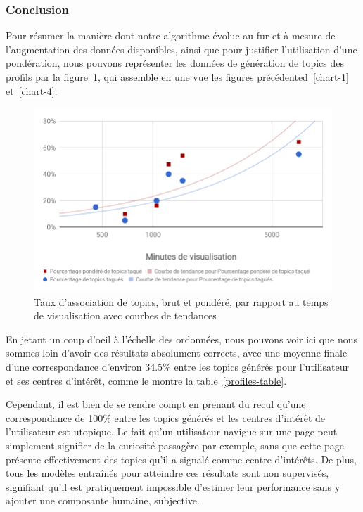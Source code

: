 		\subsubsection{Conclusion}

			Pour résumer la manière dont notre algorithme évolue au fur et à mesure de l'augmentation des données disponibles, ainsi que pour justifier l'utilisation d'une pondération, nous pouvons représenter les données de génération de topics des profils par la figure~\ref{chart-5}, qui assemble en une vue les figures précédented~\ref{chart-1} et~\ref{chart-4}.

			\begin{figure}[!h]
				\centering
				\includegraphics[height=0.65\textwidth]{images/results/chart-5}
				\caption{Taux d'association de topics, brut et pondéré, par rapport au temps de visualisation avec courbes de tendances}
				\label{chart-5}
			\end{figure}{}

			En jetant un coup d'oeil à l'échelle des ordonnées, nous pouvons voir ici que nous sommes loin d'avoir des résultats absolument corrects, avec une moyenne finale d'une correspondance d'environ 34.5\% entre les topics générés pour l'utilisateur et ses centres d'intérêt, comme le montre la table~\ref{profiles-table}.

			Cependant, il est bien de se rendre compt en prenant du recul qu'une correspondance de 100\% entre les topics générés et les centres d'intérêt de l'utilisateur est utopique.
			Le fait qu'un utilisateur navigue sur une page peut simplement signifier de la curiosité passagère par exemple, sans que cette page présente effectivement des topics qu'il a signalé comme centre d'intérêts. De plus, tous les modèles entraînés pour atteindre ces résultats sont non supervisés, signifiant qu'il est pratiquement impossible d'estimer leur performance sans y ajouter une composante humaine, subjective.


